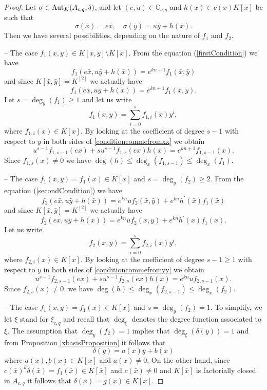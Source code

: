 \documentclass{article}
\newcommand \G {\mathbb{G}}
\renewcommand \a {A}
\renewcommand \k {K}
\newcommand \auto {{\rm Aut}}
\begin{document}
{\begin{proof}
	\medskip Let $\sigma\in\auto_{\k}(\a_{c,q},\delta)$, and let $(e,u)\in \G_{c,q}$ and $h(x)\in c(x)\k[x]$ be such that $$\sigma(\bar{x})=e\bar{x},\quad \sigma(\bar{y})=u\bar{y}+h(\bar{x}).$$ Then we have several possibilities, depending on the nature of $f_1$ and $f_2$.
	
	\medskip -- The case $f_1(x,y)\in K[x,y] \setminus \k[x]$. From the equation (\ref{firstCondition}) we have
	$$	f_1(e\bar{x},u\bar{y}+h(\bar{x}))= e^{kn+1} f_1(\bar{x}, \bar{y})$$
	and since $\k[\bar{x},\bar{y}]=K^{[2]}$ we actually have \begin{equation}\label{conditioncommefromxx} f_1(ex,uy+h(x))=e^{kn+1}f_1(x,y).\end{equation}
	Let $s = \deg_y(f_1) \geq 1$ and let us write $$ f_1(x, y) = \sum_{i=0}^{s} f_{1,i}(x) y^i,$$ where $ f_{1,i}(x) \in \k[x]$.
	By looking at the coefficient of  degree $s-1$ with respect to $y$ in both sides of \eqref{conditioncommefromxx}
	we obtain $$u^{s-1} f_{1,s-1}(ex)+su^{s-1} f_{1,s}(ex)h(x)=e^{kn+1}f_{1,s-1}(x).$$ Since $f_{1,s}(x)\neq0$ we have $\deg(h)\leq \deg_{x}(f_{1,s-1})\leq \deg_{x}(f_{1})$.
	
	\medskip -- The case $f_1(x,y)=f_1(x)\in\k[x]$ and $s=\deg_y(f_2)\geq 2$. From the equation (\ref{secondCondition}) we have 
	$$f_2(e\bar{x},u\bar{y}+h(\bar{x}))=e^{kn}u f_2(\bar{x},\bar{y}) + e^{kn}h^{\prime}(\bar{x})f_1(\bar{x})$$
	and since $\k[\bar{x},\bar{y}]=\k^{[2]}$ we actually have \begin{equation}\label{conditioncommefromyy} f_2(ex,uy+h(x))=e^{kn}u f_2(x, y)+e^{kn} h^{\prime}(x)f_1(x).\end{equation}
	Let us write $$ f_2(x, y) = \sum_{i=0}^{s} f_{2,i}(x) y^i,
	$$ where $ f_{2,i}(x) \in \k[x]$. By looking at the coefficient of  degree $s-1\geq 1$ with respect to $y$ in both sides of \eqref{conditioncommefromyy}
	we obtain $$u^{s-1} f_{2,s-1}(ex)+su^{s-1} f_{2,s}(ex)h(x)=e^{kn}uf_{2,s-1}(x).$$ Since $f_{2,s}(x)\neq0$, we have $\deg(h)\leq \deg_{x}(f_{2,s-1})\leq \deg_{x}(f_{2})$.
	
	\medskip -- The case $f_1(x,y)=f_1(x)\in\k[x]$ and $s=\deg_y(f_2)=1$. To simplify, we let $\xi$ stand for $\xi_{c,q}$ and recall that $\deg_{\xi}$ denotes the degree function associated to $\xi$. The assumption that $\deg_y(f_2)=1$ implies that $\deg_{\xi}(\delta(\bar{y}))=1$ and from Proposition \ref{xbasisProposition} it follows that \begin{equation}\label{equationThirdCase}\delta(\bar{y})=a(\bar{x})\bar{y}+b(\bar{x})\end{equation} where $a(x),b(x)\in\k[x]$ and $a(x)\neq 0$. On the other hand, since $c(\bar{x})^k\delta(\bar{x})=f_1(\bar{x})\in\k[\bar{x}]$ and $c(\bar{x})\neq 0$ and $\k[\bar{x}]$ is factorially closed in $\a_{c,q}$ it follows that $\delta(\bar{x})=g(\bar{x})\in\k[\bar{x}]$.
	

\end{proof}}
\end{document}
